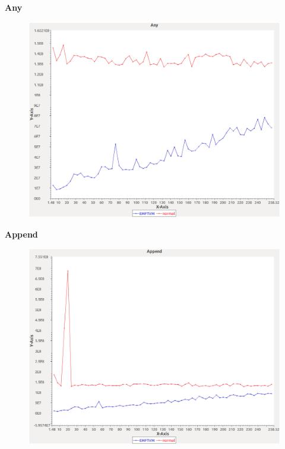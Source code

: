 
\noindent\textbf{Any}

\begin{figure}[h]
\centering	
\includegraphics[width=\textwidth]{graphs/sequence/Any}
\end{figure}
\pagebreak

\noindent\textbf{Append}

\begin{figure}[h]
\centering
\includegraphics[width=\textwidth]{graphs/sequence/Append}
\end{figure}
\pagebreak

